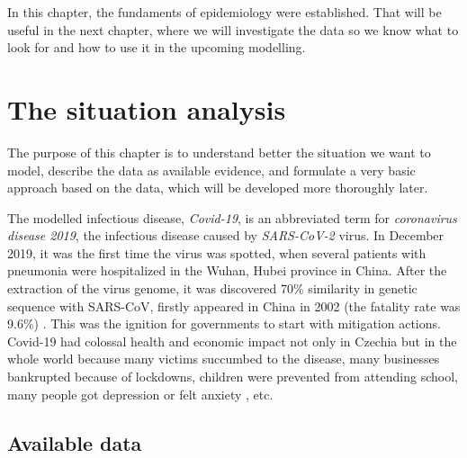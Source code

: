 \documentclass[
  digital, %
  oneside, %
  lof,     %
  lot,     %
]{fithesis4}
\begin{document}
In this chapter, the fundaments of epidemiology were established.
That will be useful in the next chapter, where we will investigate
the data so we know what to look for and how to use it in
the upcoming modelling.



\chapter{The situation analysis}

The purpose of this chapter is to understand better the situation we want to model, describe the data as available evidence, and formulate a very basic approach based on the data, which will be developed more thoroughly later.

The modelled infectious disease, \textit{Covid-19}, is an abbreviated 
term for \textit{coronavirus disease 2019}, the infectious disease 
caused by \textit{SARS-CoV-2} virus. 
In December 2019, it was the first time the virus was spotted, 
when several patients with pneumonia were hospitalized in the Wuhan, Hubei province in China. 
After the extraction of the virus genome, it was discovered 70\% similarity in genetic sequence with SARS-CoV, firstly appeared in China in 2002 (the fatality rate was 9.6\%) \cite{hui2019}.
This was the ignition for governments to start with mitigation actions.
Covid-19 had colossal health and economic impact not only in Czechia but in the whole world \cite{maital2020} because many victims succumbed to the disease, many businesses bankrupted because of lockdowns, children were prevented from attending school, many people got depression or felt anxiety \cite{khan2020}, etc.


\section{Available data}
\label{sec:available-data}
\end{document}

